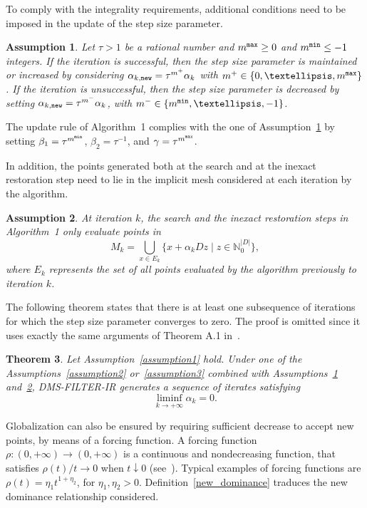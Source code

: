 \documentclass[12pt]{article}
\newtheorem{theorem}{Theorem}[section]
\newtheorem{assumption}[theorem]{Assumption}
\newcommand{\set}[1]{\{#1\}}
\begin{document}
To comply with the integrality requirements, additional conditions
need to be imposed in the update of the step size parameter.

\begin{assumption}
\label{assumption4} Let $\tau>1$ be a rational number and $m^{\tt
max}\geq 0$ and $m^{\tt min}\leq -1$ integers. If the iteration is
successful, then the step size parameter is maintained or
increased by considering $\alpha_{k,{\tt new}}=\tau^{m^+}\alpha_k$
with $m^+\in\set{0,\ldots,m^{\tt max}}$. If the iteration is
unsuccessful, then the step size parameter is decreased by setting
$\alpha_{k,{\tt new}}=\tau^{m^-}\alpha_k$, with $m^-\in\set{m^{\tt
min},\ldots,-1}$.
\end{assumption}

The update rule of Algorithm~1 complies with the one of
Assumption~\ref{assumption4} by setting $\beta_1=\tau^{m^{\tt
min}}$, $\beta_2=\tau^{-1}$, and $\gamma=\tau^{m^{\tt max}}$.

In addition, the points generated both at the search and at the
inexact restoration step need to lie in the implicit mesh
considered at each iteration by the algorithm.

\begin{assumption}
\label{assumption5} At iteration $k$, the search and the inexact
restoration steps in Algorithm~1 only evaluate points in
$$M_k=\displaystyle\bigcup_{x\in E_k} \set{x+\alpha_k Dz\mid z\in
\mathbb{N}^{|D|}_0},$$ where $E_k$ represents the set of all
points evaluated by the algorithm previously to iteration $k$.
\end{assumption}

The following theorem states that there is at least one
subsequence of iterations for which the step size parameter
converges to zero. The proof is omitted since it uses exactly the
same arguments of Theorem A.1 in~\cite{custodio2011}.

\begin{theorem}
\label{teoalfa_integerlattices} Let Assumption~\ref{assumption1}
hold. Under one of the Assumptions~\ref{assumption2}
or~\ref{assumption3} combined with Assumptions~\ref{assumption4}
and~\ref{assumption5}, DMS-FILTER-IR generates a sequence of
iterates satisfying
\begin{equation*}
\displaystyle \liminf_{k\to+\infty} \alpha_k =0.
\end{equation*}
\end{theorem}

Globalization can also be ensured by requiring sufficient decrease
to accept new points, by means of a forcing function. A forcing
function $\rho:(0,+\infty)\rightarrow (0,+\infty)$ is a continuous
and nondecreasing function, that satisfies $\rho(t)/t \rightarrow
0$ when $t \downarrow 0$ (see~\cite{kolda2003}). Typical examples
of forcing functions are $\rho(t) = \eta_1t^{1+\eta_2}$, for
$\eta_1,\eta_2
> 0$. Definition~\ref{new_dominance} traduces the new dominance
relationship considered.
\end{document}
